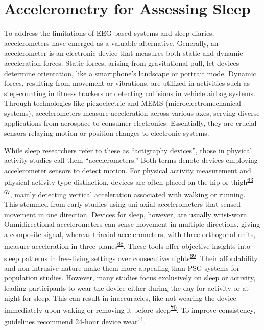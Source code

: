 \documentclass[
  10pt,
]{scrbook}
\begin{document}
\hypertarget{accelerometry-for-assessing-sleep}{%
\section{Accelerometry for Assessing
Sleep}\label{accelerometry-for-assessing-sleep}}

To address the limitations of EEG-based systems and sleep diaries,
accelerometers have emerged as a valuable alternative. Generally, an
accelerometer is an electronic device that measures both static and
dynamic acceleration forces. Static forces, arising from gravitational
pull, let devices determine orientation, like a smartphone's landscape
or portrait mode. Dynamic forces, resulting from movement or vibrations,
are utilized in activities such as step-counting in fitness trackers or
detecting collisions in vehicle airbag systems. Through technologies
like piezoelectric and MEMS (microelectromechanical systems),
accelerometers measure acceleration across various axes, serving diverse
applications from aerospace to consumer electronics. Essentially, they
are crucial sensors relaying motion or position changes to electronic
systems.

While sleep researchers refer to these as ``actigraphy devices'', those
in physical activity studies call them ``accelerometers.'' Both terms
denote devices employing accelerometer sensors to detect motion. For
physical activity measurement and physical activity type distinction,
devices are often placed on the hip or
thigh\textsuperscript{\protect\hyperlink{ref-migueles_accelerometer_2017}{63}--\protect\hyperlink{ref-arvidsson_re-examination_2019}{67}},
mainly detecting vertical acceleration associated with walking or
running. This stemmed from early studies using uni-axial accelerometers
that sensed movement in one direction. Devices for sleep, however, are
usually wrist-worn. Omnidirectional accelerometers can sense movement in
multiple directions, giving a composite signal, whereas triaxial
accelerometers, with three orthogonal units, measure acceleration in
three planes\textsuperscript{\protect\hyperlink{ref-chen_2005}{68}}.
These tools offer objective insights into sleep patterns in free-living
settings over consecutive
nights\textsuperscript{\protect\hyperlink{ref-conley_agreement_2019}{69}}.
Their affordability and non-intrusive nature make them more appealing
than PSG systems for population studies. However, many studies focus
exclusively on sleep or activity, leading participants to wear the
device either during the day for activity or at night for sleep. This
can result in inaccuracies, like not wearing the device immediately upon
waking or removing it before
sleep\textsuperscript{\protect\hyperlink{ref-meredith-jones_2016}{70}}.
To improve consistency, guidelines recommend 24-hour device
wear\textsuperscript{\protect\hyperlink{ref-tudor-locke_2012}{71}}.
\end{document}
